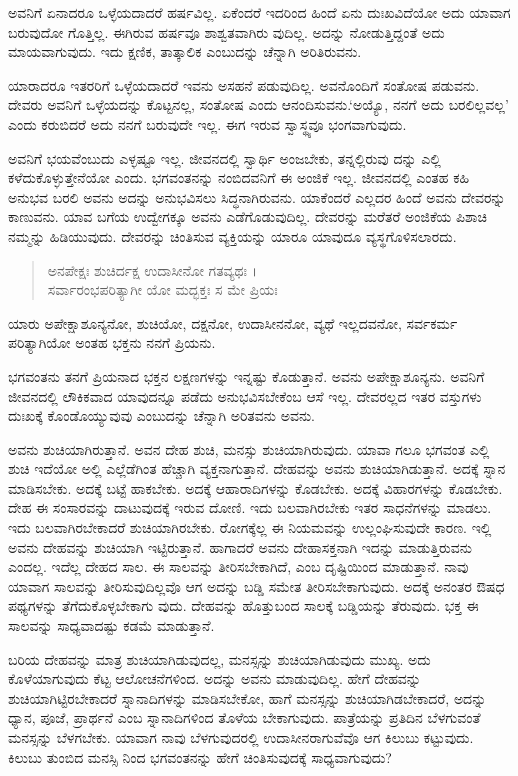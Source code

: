 ಅವನಿಗೆ ಏನಾದರೂ ಒಳ್ಳೆಯದಾದರೆ ಹರ್ಷವಿಲ್ಲ. ಏಕೆಂದರೆ ಇದರಿಂದ ಹಿಂದೆ ಏನು ದುಃಖವಿದೆಯೋ ಅದು ಯಾವಾಗ ಬರುವುದೋ ಗೊತ್ತಿಲ್ಲ. ಈಗಿರುವ ಹರ್ಷವೂ ಶಾಶ್ವತವಾಗಿರು ವುದಿಲ್ಲ. ಅದನ್ನು ನೋಡುತ್ತಿದ್ದಂತೆ ಅದು ಮಾಯವಾಗುವುದು. ಇದು ಕ್ಷಣಿಕ, ತಾತ್ಕಾಲಿಕ ಎಂಬುದನ್ನು ಚೆನ್ನಾಗಿ ಅರಿತಿರುವನು.

ಯಾರಾದರೂ ಇತರರಿಗೆ ಒಳ್ಳೆಯದಾದರೆ ಇವನು ಅಸಹನೆ ಪಡುವುದಿಲ್ಲ. ಅವನೊಂದಿಗೆ ಸಂತೋಷ ಪಡುವನು. ದೇವರು ಅವನಿಗೆ ಒಳ್ಳೆಯದನ್ನು ಕೊಟ್ಟನಲ್ಲ, ಸಂತೋಷ ಎಂದು ಆನಂದಿಸುವನು.‘ಅಯ್ಯೊ, ನನಗೆ ಅದು ಬರಲಿಲ್ಲವಲ್ಲ’ ಎಂದು ಕರುಬಿದರೆ ಅದು ನನಗೆ ಬರುವುದೇ ಇಲ್ಲ. ಈಗ ಇರುವ ಸ್ವಾಸ್ಥ್ಯವೂ ಭಂಗವಾಗುವುದು.

ಅವನಿಗೆ ಭಯವೆಂಬುದು ಎಳ್ಳಷ್ಟೂ ಇಲ್ಲ. ಜೀವನದಲ್ಲಿ ಸ್ವಾರ್ಥಿ ಅಂಜಬೇಕು, ತನ್ನಲ್ಲಿರುವು ದನ್ನು ಎಲ್ಲಿ ಕಳೆದುಕೊಳ್ಳುತ್ತೇನೆಯೋ ಎಂದು. ಭಗವಂತನನ್ನು ನಂಬಿದವನಿಗೆ ಈ ಅಂಜಿಕೆ ಇಲ್ಲ. ಜೀವನದಲ್ಲಿ ಎಂತಹ ಕಹಿ ಅನುಭವ ಬರಲಿ ಅವನು ಅದನ್ನು ಅನುಭವಿಸಲು ಸಿದ್ಧನಾಗಿರುವನು. ಯಾಕೆಂದರೆ ಎಲ್ಲದರ ಹಿಂದೆ ಅವನು ದೇವರನ್ನು ಕಾಣುವನು. ಯಾವ ಬಗೆಯ ಉದ್ವೇಗಕ್ಕೂ ಅವನು ಎಡೆಗೊಡುವುದಿಲ್ಲ. ದೇವರನ್ನು ಮರೆತರೆ ಅಂಜಿಕೆಯ ಪಿಶಾಚಿ ನಮ್ಮನ್ನು ಹಿಡಿಯುವುದು. ದೇವರನ್ನು ಚಿಂತಿಸುವ ವ್ಯಕ್ತಿಯನ್ನು ಯಾರೂ ಯಾವುದೂ ವ್ಯಸ್ಥಗೊಳಿಸಲಾರದು.

\begin{verse}
ಅನಪೇಕ್ಷಃ ಶುಚಿರ್ದಕ್ಷ ಉದಾಸೀನೋ ಗತವ್ಯಥಃ ।\\ಸರ್ವಾರಂಭಪರಿತ್ಯಾಗೀ ಯೋ ಮದ್ಭಕ್ತಃ ಸ ಮೇ ಪ್ರಿಯಃ 
\end{verse}

{\small ಯಾರು ಅಪೇಕ್ಷಾಶೂನ್ಯನೋ, ಶುಚಿಯೋ, ದಕ್ಷನೋ, ಉದಾಸೀನನೋ, ವ್ಯಥೆ ಇಲ್ಲದವನೋ, ಸರ್ವಕರ್ಮ ಪರಿತ್ಯಾಗಿಯೋ ಅಂತಹ ಭಕ್ತನು ನನಗೆ ಪ್ರಿಯನು.}

ಭಗವಂತನು ತನಗೆ ಪ್ರಿಯನಾದ ಭಕ್ತನ ಲಕ್ಷಣಗಳನ್ನು ಇನ್ನಷ್ಟು ಕೊಡುತ್ತಾನೆ. ಅವನು ಅಪೇಕ್ಷಾಶೂನ್ಯನು. ಅವನಿಗೆ ಜೀವನದಲ್ಲಿ ಲೌಕಿಕವಾದ ಯಾವುದನ್ನೂ ಪಡೆದು ಅನುಭವಿಸಬೇಕೆಂಬ ಆಸೆ ಇಲ್ಲ. ದೇವರಲ್ಲದ ಇತರ ವಸ್ತುಗಳು ದುಃಖಕ್ಕೆ ಕೊಂಡೊಯ್ಯುವುವು ಎಂಬುದನ್ನು ಚೆನ್ನಾಗಿ ಅರಿತವನು ಅವನು.

ಅವನು ಶುಚಿಯಾಗಿರುತ್ತಾನೆ. ಅವನ ದೇಹ ಶುಚಿ, ಮನಸ್ಸು ಶುಚಿಯಾಗಿರುವುದು. ಯಾವಾ ಗಲೂ ಭಗವಂತ ಎಲ್ಲಿ ಶುಚಿ ಇದೆಯೋ ಅಲ್ಲಿ ಎಲ್ಲೆಡೆಗಿಂತ ಹೆಚ್ಚಾಗಿ ವ್ಯಕ್ತನಾಗುತ್ತಾನೆ. ದೇಹವನ್ನು ಅವನು ಶುಚಿಯಾಗಿಡುತ್ತಾನೆ. ಅದಕ್ಕೆ ಸ್ನಾನ ಮಾಡಿಸಬೇಕು. ಅದಕ್ಕೆ ಬಟ್ಟೆ ಹಾಕಬೇಕು. ಅದಕ್ಕೆ ಆಹಾರಾದಿಗಳನ್ನು ಕೊಡಬೇಕು. ಅದಕ್ಕೆ ವಿಹಾರಗಳನ್ನು ಕೊಡಬೇಕು. ದೇಹ ಈ ಸಂಸಾರವನ್ನು ದಾಟುವುದಕ್ಕೆ ಇರುವ ದೋಣಿ. ಇದು ಬಲವಾಗಿರಬೇಕು ಇತರ ಸಾಧನೆಗಳನ್ನು ಮಾಡಲು. ಇದು ಬಲವಾಗಿರಬೇಕಾದರೆ ಶುಚಿಯಾಗಿರಬೇಕು. ರೋಗಕ್ಕೆಲ್ಲ ಈ ನಿಯಮವನ್ನು ಉಲ್ಲಂಘಿಸುವುದೇ ಕಾರಣ. ಇಲ್ಲಿ ಅವನು ದೇಹವನ್ನು ಶುಚಿಯಾಗಿ ಇಟ್ಟಿರುತ್ತಾನೆ. ಹಾಗಾದರೆ ಅವನು ದೇಹಾಸಕ್ತನಾಗಿ ಇದನ್ನು ಮಾಡುತ್ತಿರುವನು ಎಂದಲ್ಲ. ಇದೆಲ್ಲ ದೇಹದ ಸಾಲ. ಈ ಸಾಲವನ್ನು ತೀರಿಸಬೇಕಾಗಿದೆ, ಎಂಬ ದೃಷ್ಟಿಯಿಂದ ಮಾಡುತ್ತಾನೆ. ನಾವು ಯಾವಾಗ ಸಾಲವನ್ನು ತೀರಿಸುವುದಿಲ್ಲವೊ ಆಗ ಅದನ್ನು ಬಡ್ಡಿ ಸಮೇತ ತೀರಿಸಬೇಕಾಗುವುದು. ಅದಕ್ಕೆ ಅನಂತರ ಔಷಧ ಪಥ್ಯಗಳನ್ನು ತೆಗೆದುಕೊಳ್ಳಬೇಕಾಗು ವುದು. ದೇಹವನ್ನು ಹೊತ್ತುಬಂದ ಸಾಲಕ್ಕೆ ಬಡ್ಡಿಯನ್ನು ತೆರುವುದು. ಭಕ್ತ ಈ ಸಾಲವನ್ನು ಸಾಧ್ಯವಾದಷ್ಟು ಕಡಮೆ ಮಾಡುತ್ತಾನೆ.

ಬರಿಯ ದೇಹವನ್ನು ಮಾತ್ರ ಶುಚಿಯಾಗಿಡುವುದಲ್ಲ, ಮನಸ್ಸನ್ನು ಶುಚಿಯಾಗಿಡುವುದು ಮುಖ್ಯ. ಅದು ಕೊಳೆಯಾಗುವುದು ಕೆಟ್ಟ ಆಲೋಚನೆಗಳಿಂದ. ಅದನ್ನು ಅವನು ಮಾಡುವುದಿಲ್ಲ. ಹೇಗೆ ದೇಹವನ್ನು ಶುಚಿಯಾಗಿಟ್ಟಿರಬೇಕಾದರೆ ಸ್ನಾನಾದಿಗಳನ್ನು ಮಾಡಿಸಬೇಕೋ, ಹಾಗೆ ಮನಸ್ಸನ್ನು ಶುಚಿಯಾಗಿಡಬೇಕಾದರೆ, ಅದನ್ನು ಧ್ಯಾನ, ಪೂಜೆ, ಪ್ರಾರ್ಥನೆ ಎಂಬ ಸ್ನಾನಾದಿಗಳಿಂದ ತೊಳೆಯ ಬೇಕಾಗುವುದು. ಪಾತ್ರೆಯನ್ನು ಪ್ರತಿದಿನ ಬೆಳಗುವಂತೆ ಮನಸ್ಸನ್ನು ಬೆಳಗಬೇಕು. ಯಾವಾಗ ನಾವು ಬೆಳಗುವುದರಲ್ಲಿ ಉದಾಸೀನರಾಗುವೆವೊ ಆಗ ಕಿಲುಬು ಕಟ್ಟುವುದು. ಕಿಲುಬು ತುಂಬಿದ ಮನಸ್ಸಿ ನಿಂದ ಭಗವಂತನನ್ನು ಹೇಗೆ ಚಿಂತಿಸುವುದಕ್ಕೆ ಸಾಧ್ಯವಾಗುವುದು?

